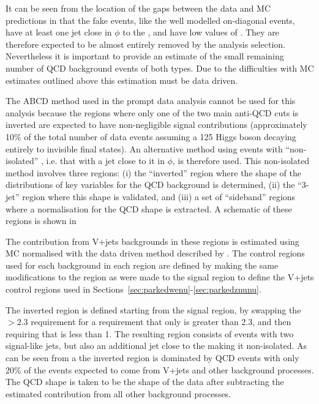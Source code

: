It can be seen from the location of the gaps between the data and \ac{MC} predictions in  that the fake \MET events, like the well modelled on-diagonal events, have at least one jet close in $\phi$ to the \MET, and have low values of \METsig. They are therefore expected to be almost entirely removed by the analysis selection. Nevertheless it is important to provide an estimate of the small remaining number of \ac{QCD} background events of both types. Due to the difficulties with \ac{MC} estimates outlined above this estimation must be data driven.

The ABCD method used in the prompt data analysis cannot be used for this analysis because the regions where only one of the two main anti-\ac{QCD} cuts is inverted are expected to have non-negligible signal contributions (approximately 10\% of the total number of data events assuming a 125 \GeV Higgs boson decaying entirely to invisible final states). An alternative method using events with ``non-isolated'' \MET, i.e. that with a jet close to it in $\phi$, is therefore used. This non-isolated method involves three regions: (i) the ``inverted'' region where the shape of the distributions of key variables for the \ac{QCD} background is determined, (ii) the ``3-jet'' region where this shape is validated, and (iii) a set of ``sideband'' regions where a normalisation for the \ac{QCD} shape is extracted. A schematic of these regions is shown in 

The contribution from V+jets backgrounds in these regions is estimated using \ac{MC} normalised with the data driven method described by . The control regions used for each background in each region are defined by making the same modifications to the region as were made to the signal region to define the V+jets control regions used in Sections~\ref{sec:parkedwenu}-\ref{sec:parkedznunu}.

The inverted region is defined starting from the signal region, by swapping the \jetmetdphi$>2.3$ requirement for a requirement that only \jetmetdphileading is greater than 2.3, and then requiring that \jetmetdphi is less than 1. The resulting region consists of events with two signal-like jets, but also an additional jet close to the \MET making it non-isolated.   As can be seen from a the inverted region is dominated by \ac{QCD} events with only 20\% of the events expected to come from V+jets and other background processes. The \ac{QCD} shape is taken to be the shape of the data after subtracting the estimated contribution from all other background processes.


